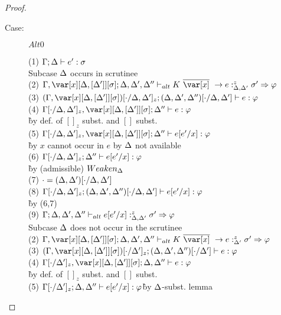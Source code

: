 \begin{proof}
\begin{description}
\item[Case:] $Alt0$
\begin{tabbing}
    (1) $\Gamma; \Delta \vdash e' : \sigma$\\
    Subcase $\Delta$ occurs in scrutinee\\
    (2) $\G,\xD; \D,\D',\D'' \vdash_{alt} K~\ov{\x}~\to e :^z_{\D,\D'} \s' \Rightarrow \vp$\\
    (3) $(\G,\xD)[\cdot/\D,\D']_z; (\D,\D',\D'')[\cdot/\D,\D'] \vdash e : \vp$\\
    (4) $\G[\cdot/\D,\D']_z, \xD; \D'' \vdash e : \vp$\\\`by def. of $[]_z$ subst. and $[]$ subst.\\
    (5) $\G[\cdot/\D,\D']_z, \xD; \D'' \vdash e[e'/x] : \vp$\\\`by $x$ cannot occur in $e$ by $\Delta$ not available\\
    (6) $\Gamma[\cdot/\Delta,\Delta']_z; \Delta'' \vdash e[e'/x] : \varphi$\\\`by (admissible) $Weaken_\Delta$\\
    (7) $\cdot = (\Delta,\Delta')[\cdot/\Delta,\Delta']$\\
    (8) $\Gamma[\cdot/\Delta,\Delta']_z; (\Delta,\Delta',\Delta'')[\cdot/\Delta,\Delta'] \vdash e[e'/x] : \varphi$\\\`by (6,7)\\
    (9) $\Gamma;\Delta,\Delta',\Delta'' \vdash_{alt} e[e'/x] :^z_{\Delta,\Delta'} \sigma' \Rightarrow \varphi$\\
    Subcase $\Delta$ does not occur in the scrutinee\\
    (2) $\G,\xD; \D,\D',\D'' \vdash_{alt} K~\ov{\x}~\to e :^z_{\D'} \s' \Rightarrow \vp$\\
    (3) $(\G,\xD)[\cdot/\D']_z; (\D,\D',\D'')[\cdot/\D'] \vdash e : \vp$\\
    (4) $\G[\cdot/\D']_z, \xD; \D,\D'' \vdash e : \vp$\\\`by def. of $[]_z$ subst. and $[]$ subst.\\
    (5) $\Gamma[\cdot/\Delta']_z; \Delta,\Delta'' \vdash e[e'/x] : \varphi$\` by $\Delta$-subst. lemma\\

\end{tabbing}
\end{description}
\end{proof}

